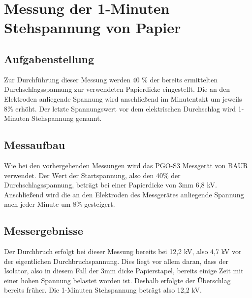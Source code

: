 \documentclass[a4paper,twoside,12pt,DIV=13,BCOR=5mm,numbers=noenddot,cleardoublepage=empty]{scrbook}
\begin{document}
		
	\section{Messung der 1-Minuten Stehspannung von Papier}
	
		\subsection{Aufgabenstellung}
		Zur Durchf\"uhrung dieser Messung werden 40 \% der bereits ermittelten Durchschlagsspannung zur verwendeten Papierdicke eingestellt. 
		Die an den Elektroden anliegende Spannung wird anschlie\ss{}end im Minutentakt um jeweils 8\% erh\"oht. 
		Der letzte Spannungswert vor dem elektrischen Durchschlag wird 1-Minuten Stehspannung genannt. 
		\subsection{Messaufbau}
		Wie bei den vorhergehenden Messungen wird das PGO-S3 Messger\"at von BAUR verwendet. 
		Der Wert der Startspannung, also den 40\% der Durchschlagsspannung, betr\"agt bei einer Papierdicke von 3mm 6,8 kV.
		Anschlie\ss{}end wird die an den Elektroden des Messger\"ates anliegende Spannung nach jeder Minute um 8\% gesteigert. 
		\subsection{Messergebnisse}
		Der Durchbruch erfolgt bei dieser Messung bereits bei 12,2 kV, also 4,7 kV vor der eigentlichen Durchbruchspannung.
		Dies liegt vor allem daran, dass der Isolator, also in diesem Fall der 3mm dicke Papierstapel, bereits einige Zeit mit einer hohen Spannung belastet worden ist.
		Deshalb erfolgte der \"Uberschlag bereits fr\"uher. Die 1-Minuten Stehspannung betr\"agt also 12,2 kV.
		
\end{document}
